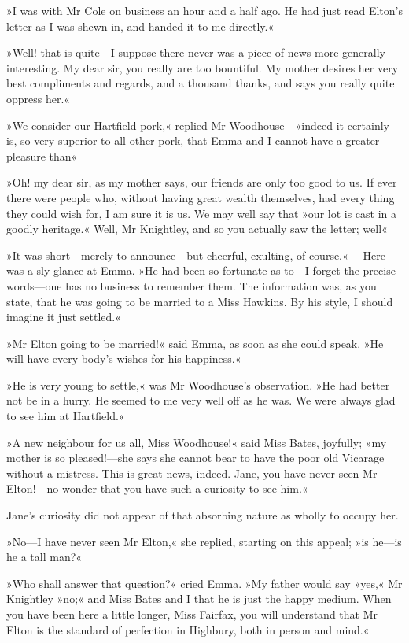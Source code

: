 »I was with Mr Cole on business an hour and a half ago. He had just read Elton's letter as I was shewn in, and handed it to me directly.«

»Well! that is quite—I suppose there never was a piece of news more generally interesting. My dear sir, you really are too bountiful. My mother desires her very best compliments and regards, and a thousand thanks, and says you really quite oppress her.«

»We consider our Hartfield pork,« replied Mr Woodhouse—»indeed it certainly is, so very superior to all other pork, that Emma and I cannot have a greater pleasure than\longdash«

»Oh! my dear sir, as my mother says, our friends are only too good to us. If ever there were people who, without having great wealth themselves, had every thing they could wish for, I am sure it is us. We may well say that »our lot is cast in a goodly heritage.« Well, Mr Knightley, and so you actually saw the letter; well\longdash«

»It was short—merely to announce—but cheerful, exulting, of course.«— Here was a sly glance at Emma. »He had been so fortunate as to—I forget the precise words—one has no business to remember them. The information was, as you state, that he was going to be married to a Miss Hawkins. By his style, I should imagine it just settled.«

»Mr Elton going to be married!« said Emma, as soon as she could speak. »He will have every body's wishes for his happiness.«

»He is very young to settle,« was Mr Woodhouse's observation. »He had better not be in a hurry. He seemed to me very well off as he was. We were always glad to see him at Hartfield.«

»A new neighbour for us all, Miss Woodhouse!« said Miss Bates, joyfully; »my mother is so pleased!—she says she cannot bear to have the poor old Vicarage without a mistress. This is great news, indeed. Jane, you have never seen Mr Elton!—no wonder that you have such a curiosity to see him.«

Jane's curiosity did not appear of that absorbing nature as wholly to occupy her.

»No—I have never seen Mr Elton,« she replied, starting on this appeal; »is he—is he a tall man?«

»Who shall answer that question?« cried Emma. »My father would say »yes,« Mr Knightley »no;« and Miss Bates and I that he is just the happy medium. When you have been here a little longer, Miss Fairfax, you will understand that Mr Elton is the standard of perfection in Highbury, both in person and mind.«


